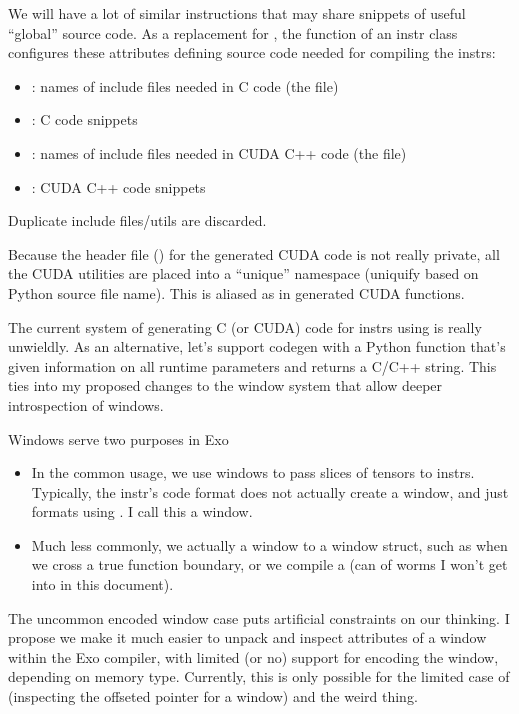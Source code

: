 \filbreak
{}

We will have a lot of similar instructions that may share snippets of useful ``global'' source code.
As a replacement for , the  function of an instr class configures these attributes defining source code needed for compiling the instrs:
\begin{itemize}
\item {}: names of include files needed in C code (the  file)
\item {}: C code snippets
\item {}: names of include files needed in CUDA C++ code (the  file)
\item {}: CUDA C++ code snippets
\end{itemize}
Duplicate include files/utils are discarded.

\filbreak
Because the header file () for the generated CUDA code is not really private, all the CUDA utilities are placed into a ``unique'' namespace (uniquify based on Python source file name).
This is aliased as  in generated CUDA functions.

\filbreak
{}

The current system of generating C (or CUDA) code for instrs using  is really unwieldly.
As an alternative, let's support codegen with a Python function that's given information on all runtime parameters and returns a C/C++ string.
This ties into my proposed changes to the window system that allow deeper introspection of windows.

\newpage
{}
\label{ch:Windows}

Windows serve two purposes in Exo
\begin{itemize}
 \item In the common usage, we use windows to pass slices of tensors to instrs.
 Typically, the instr's code format does not actually create a window, and just formats using .
 I call this a  window.
 \item Much less commonly, we actually  a window to a window struct, such as when we cross a true function boundary, or we compile a  (can of worms I won't get into in this document).
\end{itemize}
\filbreak
The uncommon encoded window case puts artificial constraints on our thinking.
I propose we make it much easier to unpack and inspect attributes of a window within the Exo compiler, with limited (or no) support for encoding the window, depending on memory type.
Currently, this is only possible for the limited case of  (inspecting the offseted pointer for a window) and the weird  thing.

